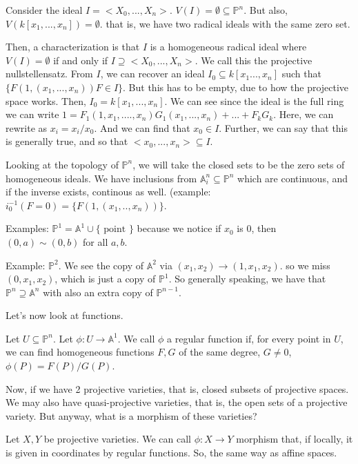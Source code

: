 \documentclass[10pt]{article}
\begin{document}
Consider the ideal $I = <X_0,...,X_n>$. $V(I) = \emptyset \subseteq \mathbb{P}^n$. But also, $V(k[x_1,...,x_n]) = \emptyset$. that is, we have two radical ideals with the same zero set. 

Then, a characterization is that $I$ is a homogeneous radical ideal where $V(I) = \emptyset$ if and only if $I \supseteq <X_0,...,X_n >$. We call this the projective nullstellensatz. From $I$, we can recover an ideal $I_0 \subseteq k[x_1...,x_n]$ such that $\{ F(1,(x_1,...,x_n)) F \in I \}$. But this has to be empty, due to how the projective space works. Then, $I_0 = k[x_1,...,x_n]$. We can see since the ideal is the full ring we can write $1 = F_1(1,x_1,....,x_n)G_1(x_1,...,x_n) + ... + F_kG_k$. Here, we can rewrite as $x_i = x_i/x_0$. And we can find that $x_0 \in I$. Further, we can say that this is generally true, and so that $<x_0,...,x_n> \subseteq I$.  

Looking at the topology of $\mathbb{P}^n$, we will take the closed sets to be the zero sets of homogeneous ideals. We have inclusions from $\mathbb{A}^n_i \subseteq \mathbb{P}^n$ which are continuous, and if the inverse exists, continous as well. (example: $i_0^{-1} (F = 0) = \{ F(1,(x_1,..,x_n)) \}$.

Examples: $\mathbb{P}^1 = \mathbb{A}^1 \cup \{ \text{ point } \} $ because we notice if $x_0$ is $0$, then $(0,a) \sim (0,b)$ for all $a,b$. 

Example: $\mathbb{P}^2$. We see the copy of $\mathbb{A}^2$ via $(x_1,x_2) \to (1,x_1,x_2)$. so we miss $(0,x_1,x_2)$, which is just a copy of $\mathbb{P}^1$. So generally speaking, we have that $\mathbb{P}^n \supseteq \mathbb{A}^n$ with also an extra copy of $\mathbb{P}^{n-1}$.

Let’s now look at functions.

Let $U \subseteq \mathbb{P}^n$. Let $\phi: U \to \mathbb{A}^1$. We call $\phi$ a regular function if, for every point in $U$, we can find homogeneous functions $F,G$ of the same degree, $G \not = 0$, $\phi(P) = F(P) /G(P)$.

Now, if we have 2 projective varieties, that is, closed subsets of projective spaces. We may also have quasi-projective varieties, that is, the open sets of a projective variety. But anyway, what is a morphism of these varieties?

Let $X,Y$ be projective varieties. We can call $\phi: X \to Y$ morphism that, if locally, it is given in coordinates by regular functions. So, the same way as affine spaces.
\end{document}
